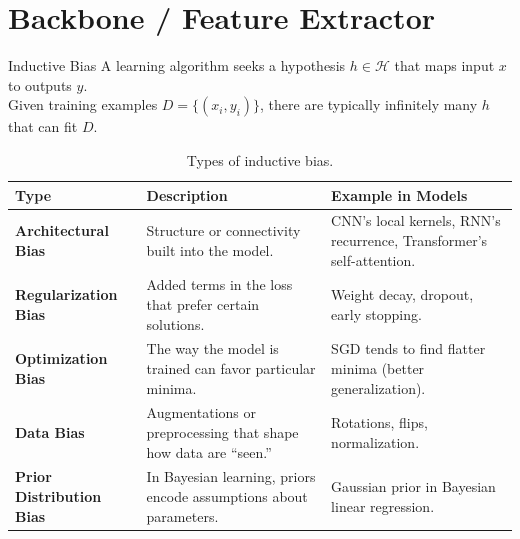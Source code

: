\documentclass[xcolor=dvipsnames,aspectratio=169]{beamer}
\begin{document}
    \section{Backbone / Feature Extractor}
        \begin{frame}{Inductive Bias}
            A learning algorithm seeks a hypothesis $h \in \mathcal{H}$ that maps input $x$ to outputs $y$. \\
            Given training examples $D = \{ (x_{i}, y_{i}) \}$, there are typically infinitely many $h$ that can fit $D$. \\

            \begin{table}[h]
                \tiny
                \centering
                \renewcommand{\arraystretch}{1.4}
                \begin{tabular}{|l|p{5cm}|p{5cm}|}
                    \hline
                    \textbf{Type} & \textbf{Description} & \textbf{Example in Models} \\
                    \hline
                    \textbf{Architectural Bias} & 
                    Structure or connectivity built into the model. &
                    CNN’s local kernels, RNN’s recurrence, Transformer’s self-attention. \\
                    \hline
                    \textbf{Regularization Bias} & 
                    Added terms in the loss that prefer certain solutions. &
                    Weight decay, dropout, early stopping. \\
                    \hline
                    \textbf{Optimization Bias} & 
                    The way the model is trained can favor particular minima. &
                    SGD tends to find flatter minima (better generalization). \\
                    \hline
                    \textbf{Data Bias} & 
                    Augmentations or preprocessing that shape how data are “seen.” &
                    Rotations, flips, normalization. \\
                    \hline
                    \textbf{Prior Distribution Bias} & 
                    In Bayesian learning, priors encode assumptions about parameters. &
                    Gaussian prior in Bayesian linear regression. \\
                    \hline
                \end{tabular}
                \caption{Types of inductive bias.}
            \end{table}
        \end{frame}
\end{document}
